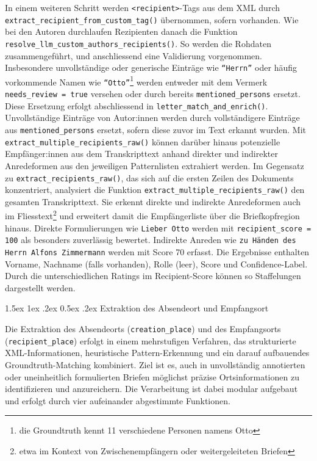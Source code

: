 \documentclass[12pt, a4paper, ngerman, bidi=default]{article}
\makeatletter
\newcommand{\code}[1]{\colorbox{VeryLightGray}{\texttt{#1}}} %
\let\oldparagraph\paragraph%
\renewcommand{\paragraph}{
    \@ifstar%
      \xxxParagraphStar%
      \xxxParagraphNoStar%
 }
\newcommand{\xxxParagraphStar}[1]{\oldparagraph*{#1}\mbox{}}
\newcommand{\xxxParagraphNoStar}[1]{\oldparagraph{#1}\mbox{}}
\renewcommand\paragraph{\@startsection{paragraph}{4}{0em}%
  {1.5ex \@plus1ex \@minus.2ex}%
  {0.5ex \@plus.2ex}%
  {\normalfont\normalsize\bfseries\itshape}}
\makeatother
\begin{document}
In einem weiteren Schritt werden \code{<recipient>}-Tags aus dem XML durch \code{extract\_recipient\_from\_custom\_tag()} übernommen, sofern vorhanden. Wie bei den Autoren durchlaufen Rezipienten danach die Funktion \code{resolve\_llm\_custom\_authors\_recipients()}. So werden die Rohdaten zusammengeführt, und anschliessend eine Validierung vorgenommen. Insbesondere unvollständige oder generische Einträge wie \texttt{\enquote{Herrn}} oder häufig vorkommende Namen wie \texttt{\enquote{Otto}}\footnote{die Groundtruth kennt 11 verschiedene Personen namens Otto} werden entweder mit dem Vermerk \code{needs\_review = true} versehen oder durch bereits \code{mentioned\_persons} ersetzt. Diese Ersetzung erfolgt abschliessend in \code{letter\_match\_and\_enrich()}.  Unvollständige Einträge von Autor:innen werden durch vollständigere Einträge aus \code{mentioned\_persons} ersetzt, sofern diese zuvor im Text erkannt wurden. Mit \code{extract\_multiple\_recipients\_raw()} können darüber hinaus potenzielle Empfänger:innen aus dem Transkripttext anhand direkter und indirekter Anredeformen aus den jeweiligen Patternlisten extrahiert werden. Im Gegensatz zu \code{extract\_recipients\_raw()}, das sich auf die ersten Zeilen des Dokuments konzentriert, analysiert die Funktion \code{extract\_multiple\_recipients\_raw()} den gesamten Transkripttext. Sie erkennt direkte und indirekte Anredeformen auch im Fliesstext\footnote{etwa im Kontext von Zwischenempfängern oder weitergeleiteten Briefen} und erweitert damit die Empfängerliste über die Briefkopfregion hinaus. Direkte Formulierungen wie \texttt{Lieber Otto} werden mit \code{recipient\_score = 100} als besonders zuverlässig bewertet. Indirekte Anreden wie \texttt{zu Händen des Herrn Alfons Zimmermann} werden mit Score 70 erfasst. Die Ergebnisse enthalten Vorname, Nachname (falls vorhanden), Rolle (leer), Score und Confidence-Label. Durch die unterschiedlichen Ratings im Recipient-Score können so Staffelungen dargestellt werden.


\paragraph{Extraktion des Absendeort und Empfangsort}

Die Extraktion des Absendeorts (\code{creation\_place}) und des Empfangsorts (\code{recipient\_place}) erfolgt in einem mehrstufigen Verfahren, das strukturierte XML-Informationen, heuristische Pattern-Erkennung und ein darauf aufbauendes Groundtruth-Matching kombiniert. Ziel ist es, auch in unvollständig annotierten oder uneinheitlich formulierten Briefen möglichst präzise Ortsinformationen zu identifizieren und anzureichern. Die Verarbeitung ist dabei modular aufgebaut und erfolgt durch vier aufeinander abgestimmte Funktionen.
\end{document}
